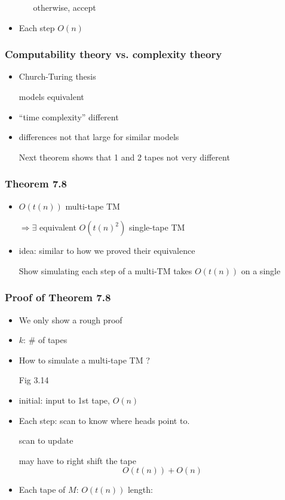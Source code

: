 \begin{frame}[allowframebreaks]
\begin{itemize}
\begin{enumerate}
otherwise, accept
  \end{enumerate}

\item Each step $O(n)$

\end{itemize}\end{frame} \begin{frame}[allowframebreaks] \frametitle{Computability theory vs. complexity theory}
    \begin{itemize}
\item Church-Turing thesis

models equivalent
\item ``time complexity'' different
\item differences not that large for similar models

Next theorem shows that 1 and 2 tapes not very different

\end{itemize}\end{frame} \begin{frame}[allowframebreaks] \frametitle{Theorem 7.8}
  \begin{itemize}
  \item
    $O(t(n))$ multi-tape TM

$\Rightarrow \exists$ equivalent 
$O(t(n)^2)$ single-tape TM
\item idea: similar to how we proved their equivalence

Show simulating each step of a multi-TM
takes
$O(t(n))$ on a single

\end{itemize}\end{frame} \begin{frame}[allowframebreaks] \frametitle{Proof of Theorem 7.8}
  \begin{itemize}
\item We only show a rough proof

\item $k$: \# of tapes
\item How to simulate a multi-tape TM ?

Fig 3.14
\item initial: input to 1st tape, $O(n)$
\item Each step: scan to know where heads point to.

scan to update

may have to right shift the tape
\begin{equation*}
  O(t(n))+O(n)
\end{equation*}
\item Each tape of $M$: $O(t(n))$ length:


\end{itemize}
\end{frame}
